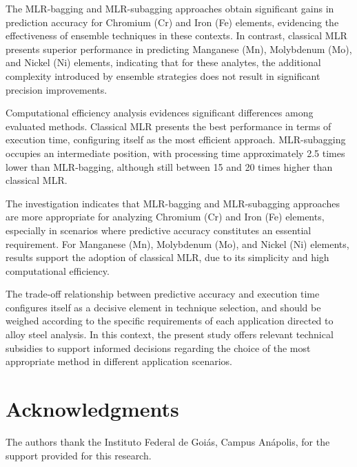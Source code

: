 \documentclass[12pt]{article}
\begin{document}
The MLR-bagging and MLR-subagging approaches obtain significant gains in prediction accuracy for Chromium (Cr) and Iron (Fe) elements, evidencing the effectiveness of ensemble techniques in these contexts. In contrast, classical MLR presents superior performance in predicting Manganese (Mn), Molybdenum (Mo), and Nickel (Ni) elements, indicating that for these analytes, the additional complexity introduced by ensemble strategies does not result in significant precision improvements.

Computational efficiency analysis evidences significant differences among evaluated methods. Classical MLR presents the best performance in terms of execution time, configuring itself as the most efficient approach. MLR-subagging occupies an intermediate position, with processing time approximately 2.5 times lower than MLR-bagging, although still between 15 and 20 times higher than classical MLR.

The investigation indicates that MLR-bagging and MLR-subagging approaches are more appropriate for analyzing Chromium (Cr) and Iron (Fe) elements, especially in scenarios where predictive accuracy constitutes an essential requirement. For Manganese (Mn), Molybdenum (Mo), and Nickel (Ni) elements, results support the adoption of classical MLR, due to its simplicity and high computational efficiency.

The trade-off relationship between predictive accuracy and execution time configures itself as a decisive element in technique selection, and should be weighed according to the specific requirements of each application directed to alloy steel analysis. In this context, the present study offers relevant technical subsidies to support informed decisions regarding the choice of the most appropriate method in different application scenarios.

\section*{Acknowledgments}

The authors thank the Instituto Federal de Goiás, Campus Anápolis, for the support provided for this research.




\thispagestyle{empty}%
\end{document}
